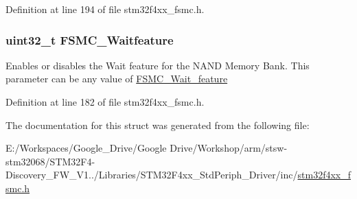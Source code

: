 Definition at line 194 of file stm32f4xx\-\_\-fsmc.\-h.

\hypertarget{struct_f_s_m_c___n_a_n_d_init_type_def_a9ecc2cc3ec6462a8a86e545c9b8ff3cf}{
\subsubsection[{F\-S\-M\-C\-\_\-\-Waitfeature}]{\setlength{\rightskip}{0pt plus 5cm}uint32\-\_\-t F\-S\-M\-C\-\_\-\-Waitfeature}}\label{struct_f_s_m_c___n_a_n_d_init_type_def_a9ecc2cc3ec6462a8a86e545c9b8ff3cf}
Enables or disables the Wait feature for the N\-A\-N\-D Memory Bank. This parameter can be any value of \hyperlink{group___f_s_m_c___wait__feature}{F\-S\-M\-C\-\_\-\-Wait\-\_\-feature} 

Definition at line 182 of file stm32f4xx\-\_\-fsmc.\-h.



The documentation for this struct was generated from the following file\-:\begin{DoxyCompactItemize}
\item 
E\-:/\-Workspaces/\-Google\-\_\-\-Drive/\-Google Drive/\-Workshop/arm/stsw-\/stm32068/\-S\-T\-M32\-F4-\/\-Discovery\-\_\-\-F\-W\-\_\-\-V1../\-Libraries/\-S\-T\-M32\-F4xx\-\_\-\-Std\-Periph\-\_\-\-Driver/inc/\hyperlink{stm32f4xx__fsmc_8h}{stm32f4xx\-\_\-fsmc.\-h}\end{DoxyCompactItemize}
